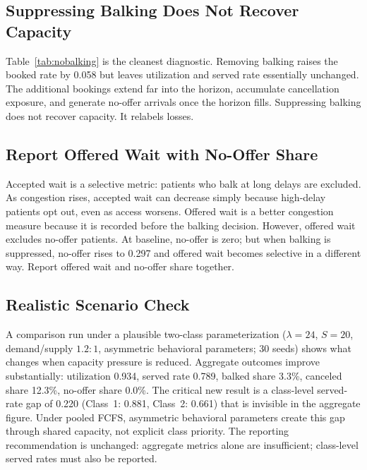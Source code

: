 \documentclass[10pt]{article}
\begin{document}
\subsection*{Suppressing Balking Does Not Recover Capacity}

Table~\ref{tab:nobalking} is the cleanest diagnostic. Removing balking
raises the booked rate by 0.058 but leaves utilization and served rate
essentially unchanged. The additional bookings extend far into the horizon,
accumulate cancellation exposure, and generate no-offer arrivals once the
horizon fills. Suppressing balking does not recover capacity. It relabels
losses.

\subsection*{Report Offered Wait with No-Offer Share}

Accepted wait is a selective metric: patients who balk at long delays are
excluded. As congestion rises, accepted wait can decrease simply because
high-delay patients opt out, even as access worsens. Offered wait is a better
congestion measure because it is recorded before the balking decision.
However, offered wait excludes no-offer patients. At baseline, no-offer is
zero; but when balking is suppressed, no-offer rises to 0.297 and offered
wait becomes selective in a different way. Report offered wait and no-offer
share together.

\subsection*{Realistic Scenario Check}

A comparison run under a plausible two-class parameterization (\(\lambda=24\),
\(S=20\), demand/supply \(1.2:1\), asymmetric behavioral parameters; 30 seeds) shows what changes when capacity pressure is
reduced. Aggregate outcomes improve substantially: utilization 0.934, served
rate 0.789, balked share 3.3\%, canceled share 12.3\%, no-offer share 0.0\%.
The critical new result is a class-level served-rate gap of 0.220 (Class~1:
0.881, Class~2: 0.661) that is invisible in the aggregate figure. Under pooled
FCFS, asymmetric behavioral parameters create this gap through shared capacity,
not explicit class priority. The reporting recommendation is unchanged: aggregate
metrics alone are insufficient; class-level served rates must also be reported.

\end{document}
